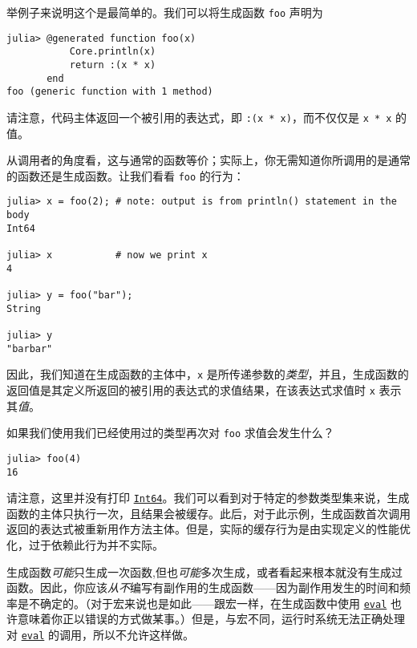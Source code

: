 举例子来说明这个是最简单的。我们可以将生成函数 \texttt{foo} 声明为




\begin{verbatim}
julia> @generated function foo(x)
           Core.println(x)
           return :(x * x)
       end
foo (generic function with 1 method)
\end{verbatim}



请注意，代码主体返回一个被引用的表达式，即 \texttt{:(x * x)}，而不仅仅是 \texttt{x * x} 的值。



从调用者的角度看，这与通常的函数等价；实际上，你无需知道你所调用的是通常的函数还是生成函数。让我们看看 \texttt{foo} 的行为：




\begin{verbatim}
julia> x = foo(2); # note: output is from println() statement in the body
Int64

julia> x           # now we print x
4

julia> y = foo("bar");
String

julia> y
"barbar"
\end{verbatim}



因此，我们知道在生成函数的主体中，\texttt{x} 是所传递参数的\emph{类型}，并且，生成函数的返回值是其定义所返回的被引用的表达式的求值结果，在该表达式求值时 \texttt{x} 表示其\emph{值}。



如果我们使用我们已经使用过的类型再次对 \texttt{foo} 求值会发生什么？




\begin{verbatim}
julia> foo(4)
16
\end{verbatim}



请注意，这里并没有打印 \hyperlink{7720564657383125058}{\texttt{Int64}}。我们可以看到对于特定的参数类型集来说，生成函数的主体只执行一次，且结果会被缓存。此后，对于此示例，生成函数首次调用返回的表达式被重新用作方法主体。但是，实际的缓存行为是由实现定义的性能优化，过于依赖此行为并不实际。



生成函数\emph{可能}只生成一次函数,但也\emph{可能}多次生成，或者看起来根本就没有生成过函数。因此，你应该\emph{从不}编写有副作用的生成函数——因为副作用发生的时间和频率是不确定的。（对于宏来说也是如此——跟宏一样，在生成函数中使用 \hyperlink{7507639810592563424}{\texttt{eval}} 也许意味着你正以错误的方式做某事。）但是，与宏不同，运行时系统无法正确处理对 \hyperlink{7507639810592563424}{\texttt{eval}} 的调用，所以不允许这样做。



